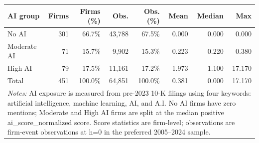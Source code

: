 \begin{tabular}{lrrrrrrr}
\toprule
AI group & Firms & Firms (\%) & Obs. & Obs. (\%) & Mean & Median & Max \\
\midrule
No AI & 301 & 66.7\% & 43,788 & 67.5\% & 0.000 & 0.000 & 0.000 \\
Moderate AI & 71 & 15.7\% & 9,902 & 15.3\% & 0.223 & 0.220 & 0.380 \\
High AI & 79 & 17.5\% & 11,161 & 17.2\% & 1.973 & 1.100 & 17.170 \\
Total & 451 & 100.0\% & 64,851 & 100.0\% & 0.381 & 0.000 & 17.170 \\
\bottomrule
\multicolumn{8}{p{0.95\linewidth}}{\footnotesize \textit{Notes:}
AI exposure is measured from pre-2023 10-K filings using four keywords:
artificial intelligence, machine learning, AI, and A.I. No AI firms have zero
mentions; Moderate and High AI firms are split at the median positive
ai\_score\_normalized score. Score statistics are firm-level; observations are
firm-event observations at h=0 in the preferred 2005--2024 sample.} \\
\end{tabular}
